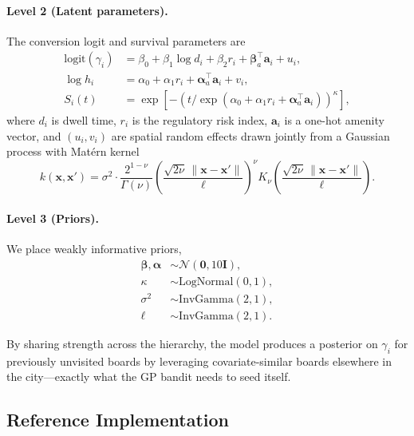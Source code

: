 \documentclass[sigconf,nonacm]{acmart}
\begin{document}
\paragraph{Level 2 (Latent parameters).} The conversion logit and survival parameters are
\begin{align}
    \mathrm{logit}(\gamma_i) &= \beta_0 + \beta_1 \log d_i + \beta_2 r_i + \boldsymbol{\beta}_a^\top \mathbf{a}_i + u_i, \\
    \log h_i &= \alpha_0 + \alpha_1 r_i + \boldsymbol{\alpha}_a^\top \mathbf{a}_i + v_i, \\
    S_i(t) &= \exp\!\left[-\left(t / \exp(\alpha_0 + \alpha_1 r_i + \boldsymbol{\alpha}_a^\top \mathbf{a}_i)\right)^\kappa\right],
\end{align}
where $d_i$ is dwell time, $r_i$ is the regulatory risk index, $\mathbf{a}_i$ is a one-hot amenity vector, and $(u_i, v_i)$ are spatial random effects drawn jointly from a Gaussian process with Mat\'ern kernel
\begin{equation}
    k(\mathbf{x}, \mathbf{x}') = \sigma^2 \cdot \frac{2^{1-\nu}}{\Gamma(\nu)} \left(\frac{\sqrt{2\nu} \, \|\mathbf{x} - \mathbf{x}'\|}{\ell}\right)^\nu K_\nu\!\left(\frac{\sqrt{2\nu} \, \|\mathbf{x} - \mathbf{x}'\|}{\ell}\right).
\end{equation}

\paragraph{Level 3 (Priors).} We place weakly informative priors,
\begin{align}
    \boldsymbol{\beta}, \boldsymbol{\alpha} &\sim \mathcal{N}(\mathbf{0}, 10 \mathbf{I}), \\
    \kappa &\sim \text{LogNormal}(0, 1), \\
    \sigma^2 &\sim \text{InvGamma}(2, 1), \\
    \ell &\sim \text{InvGamma}(2, 1).
\end{align}

By sharing strength across the hierarchy, the model produces a posterior on $\gamma_i$ for previously unvisited boards by leveraging covariate-similar boards elsewhere in the city---exactly what the GP bandit needs to seed itself.

\subsection{Reference Implementation}
\end{document}
